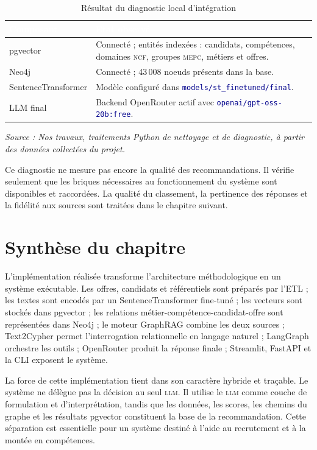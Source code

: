 \documentclass[12pt,twoside]{report}
\newcommand{\source}[1]{%
  \par\vspace{0.2\baselineskip}
  {\centering\footnotesize\itshape Source : #1\par}
}
\newcommand{\filevar}[1]{\texttt{\textcolor{darkblue}{#1}}}
\newcommand{\tabheader}[1]{\textcolor{white}{\textbf{#1}}}
\newcommand{\tableStyleStart}{%
  \small
  \renewcommand{\arraystretch}{1.12}%
  \setlength{\tabcolsep}{4pt}%
  \rowcolors{2}{lightblue!12}{white}%
}
\newcommand{\tableStyleEnd}{%
  \rowcolors{2}{}{}%
  \renewcommand{\arraystretch}{1}%
}
\newcommand{\MEPC}{\textsc{mepc}}
\newcommand{\NCF}{\textsc{ncf}}
\newcommand{\LLM}{\textsc{llm}}
\begin{document}
\begin{table}[H]
  \centering
  \caption{Résultat du diagnostic local d'intégration}
  \label{tab:diagnostic_integration_chap3}
  \tableStyleStart
  \begin{tabularx}{\textwidth}{p{3.4cm}X}
    \rowcolor{darkblue}
    \tabheader{Composant} & \tabheader{Etat observé} \\
    \midrule
    pgvector & Connecté ; entités indexées : candidats, compétences, domaines \NCF{}, groupes \MEPC{}, métiers et offres. \\
    Neo4j & Connecté ; 43\,008 noeuds présents dans la base. \\
    SentenceTransformer & Modèle configuré dans \filevar{models/st\_finetuned/final}. \\
    LLM final & Backend OpenRouter actif avec \filevar{openai/gpt-oss-20b:free}. \\
    \bottomrule
  \end{tabularx}
  \tableStyleEnd
  \source{Nos travaux, traitements Python de nettoyage et de diagnostic, à partir des données collectées du projet.}
\end{table}

Ce diagnostic ne mesure pas encore la qualité des recommandations. Il vérifie seulement que les briques nécessaires au fonctionnement du système sont disponibles et raccordées. La qualité du classement, la pertinence des réponses et la fidélité aux sources sont traitées dans le chapitre suivant.

\section{Synthèse du chapitre}

L'implémentation réalisée transforme l'architecture méthodologique en un système exécutable. Les offres, candidats et référentiels sont préparés par l'ETL ; les textes sont encodés par un SentenceTransformer fine-tuné ; les vecteurs sont stockés dans pgvector ; les relations métier-compétence-candidat-offre sont représentées dans Neo4j ; le moteur GraphRAG combine les deux sources ; Text2Cypher permet l'interrogation relationnelle en langage naturel ; LangGraph orchestre les outils ; OpenRouter produit la réponse finale ; Streamlit, FastAPI et la CLI exposent le système.

La force de cette implémentation tient dans son caractère hybride et traçable. Le système ne délègue pas la décision au seul \LLM{}. Il utilise le \LLM{} comme couche de formulation et d'interprétation, tandis que les données, les scores, les chemins du graphe et les résultats pgvector constituent la base de la recommandation. Cette séparation est essentielle pour un système destiné à l'aide au recrutement et à la montée en compétences.
\end{document}
